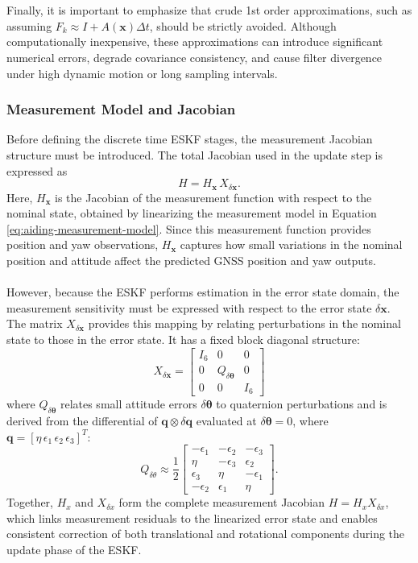 \\ \\
Finally, it is important to emphasize that crude 1st order approximations, such as assuming $F_k \approx I + A(\mathbf{x})\Delta t$, should be strictly avoided. Although computationally inexpensive, these approximations can introduce significant numerical errors, degrade covariance consistency, and cause filter divergence under high dynamic motion or long sampling intervals.



\subsubsection{Measurement Model and Jacobian}
Before defining the discrete time ESKF stages, the measurement Jacobian structure must be introduced. The total Jacobian used in the update step is expressed as
$$
    H = H_{\mathbf{x}} \, X_{\delta \mathbf{x}}.
$$
Here, $H_{\mathbf{x}}$ is the Jacobian of the measurement function with respect to the nominal state, obtained by linearizing the measurement model in Equation \ref{eq:aiding-measurement-model}. Since this measurement function provides position and yaw observations, $H_{\mathbf{x}}$ captures how small variations in the nominal position and attitude affect the predicted GNSS position and yaw outputs.  
\\ \\
However, because the ESKF performs estimation in the error state domain, the measurement sensitivity must be expressed with respect to the error state $\delta\mathbf{x}$. The matrix $X_{\delta \mathbf{x}}$ provides this mapping by relating perturbations in the nominal state to those in the error state. It has a fixed block diagonal structure:
$$
    X_{\delta \mathbf{x}} =
    \begin{bmatrix}
        I_6 & 0 & 0 \\
        0 & Q_{\delta\boldsymbol{\theta}} & 0 \\
        0 & 0 & I_6
    \end{bmatrix}
$$
where $Q_{\delta\boldsymbol{\theta}}$ relates small attitude errors $\delta\boldsymbol{\theta}$ to quaternion perturbations and is derived from the differential of $\mathbf{q} \otimes \delta\mathbf{q}$ evaluated at $\delta\boldsymbol{\theta}=0$, where $\mathbf{q} = [\eta \, \epsilon_1 \, \epsilon_2 \, \epsilon_3]^T$:
$$
    Q_{\delta\theta} \approx
    \frac{1}{2}
    \begin{bmatrix}
        -\epsilon_1 & -\epsilon_2 & -\epsilon_3 \\
         \eta & -\epsilon_3 & \epsilon_2 \\
         \epsilon_3 & \eta & -\epsilon_1 \\
        -\epsilon_2 & \epsilon_1 & \eta
    \end{bmatrix}.
$$
Together, $H_x$ and $X_{\delta x}$ form the complete measurement Jacobian $H = H_x X_{\delta x}$, which links measurement residuals to the linearized error state and enables consistent correction of both translational and rotational components during the update phase of the ESKF.



